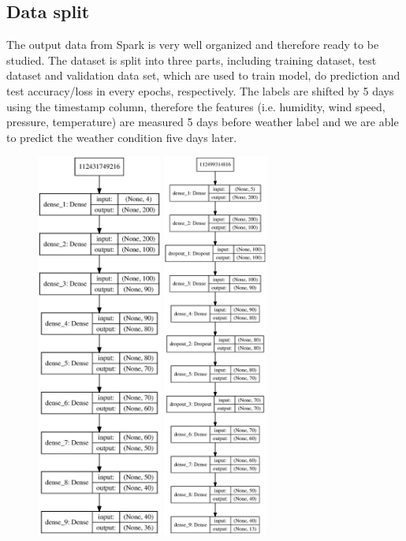 \documentclass[runningheads]{llncs}
\begin{document}
\subsection{Data split}
The output data from Spark is very well organized and therefore ready to be studied. The dataset is split into three parts, including training dataset, test dataset and validation data set, which are used to train model, do prediction and test accuracy/loss in every epochs, respectively. The labels are shifted by 5 days using the timestamp column, therefore the features (i.e. humidity, wind speed, pressure, temperature) are measured 5 days before weather label and we are able to predict the weather condition five days later.

\begin{figure}
    \centering
    \includegraphics[height=5in]{model.eps}
    \includegraphics[height=5in]{model-with-drop.eps}

\end{figure}
\end{document}
